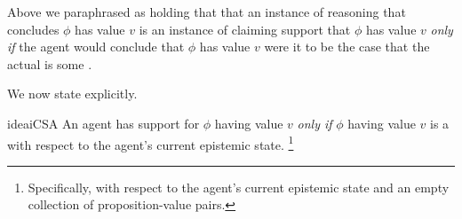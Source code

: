 \begin{note}
  Above we paraphrased \ideaCSA{} as holding that that an instance of reasoning that concludes \(\phi\) has value \(v\) is an instance of claiming support that \(\phi\) has value \(v\) \emph{only if} the agent would conclude that \(\phi\) has value \(v\) were it to be the case that the actual \world{} is some \epPAd{} \world{}.

  We now state \ideaCSA{} explicitly.
\end{note}

\begin{note}
  \begin{restatable}{idea}{iCSA}
    \label{idea:defs-for-CS}
    An agent \vAgent{} has support for \(\phi\) having value \(v\) \emph{only if} \(\phi\) having value \(v\) is a \sink{} with respect to the agent's current epistemic state.\nolinebreak
    \footnote{Specifically, with respect to the agent's current epistemic state and an empty collection of proposition-value pairs.}
\end{restatable}
\end{note}

